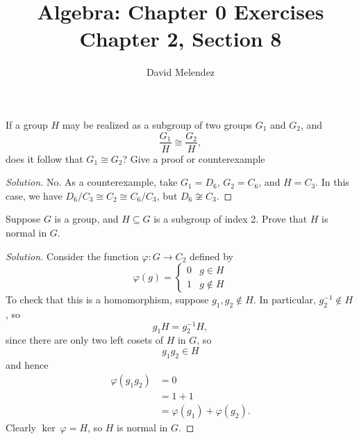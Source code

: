\documentclass[12pt]{article}
\newenvironment{problem}[2][Problem]{\begin{trivlist}
\item[\hskip \labelsep {\bfseries #1}\hskip \labelsep {\bfseries #2.}]}{\end{trivlist}}
\newenvironment{solution}
  {\renewcommand\qedsymbol{$\blacksquare$}\begin{proof}[Solution]}
{\end{proof}}
\theoremstyle{remark}
\begin{document}
\title{Algebra: Chapter 0 Exercises\\ \large Chapter 2, Section 8}
\author{David Melendez}
\maketitle

\begin{problem}{8.1}
  If a group $H$ may be realized as a subgroup of two groups $G_1$ and $G_2$, and
  \begin{equation*}
    \frac{G_1}{H} \cong \frac{G_2}{H},
  \end{equation*}
  does it follow that $G_1\cong G_2$?
  Give a proof or counterexample
\end{problem}
\begin{solution}
  No.
  As a counterexample, take $G_1 = D_6$, $G_2 = C_6$, and $H=C_3$. 
  In this case, we have $D_6/C_3\cong C_2\cong C_6/C_3$, but $D_6\not\cong C_3$.
\end{solution}

\begin{problem}{8.2}
  Suppose $G$ is a group, and $H\subseteq G$ is a subgroup of index 2.
  Prove that $H$ is normal in $G$.
\end{problem}
\begin{solution}
  Consider the function $\varphi : G\to C_2$ defined by
  \begin{equation*}
    \varphi(g) = \begin{cases}
      0 & g\in H \\
      1 & g\not\in H
    \end{cases}
  \end{equation*}
  To check that this is a homomorphism, suppose $g_1,g_2\not\in H$.
  In particular, $g_2^{-1}\not\in H$, so 
  \begin{equation*}
    g_1H = g_2^{-1}H,
  \end{equation*}
  since there are only two left cosets of $H$ in $G$, so
  \begin{equation*}
    g_1g_2\in H
  \end{equation*}
  and hence
  \begin{align*}
    \varphi(g_1g_2) &= 0 \\
    &= 1+1\\
    &= \varphi(g_1) + \varphi(g_2).
  \end{align*}
  Clearly $\ker\ \varphi=H$, so $H$ is normal in $G$.
\end{solution}
\end{document}
